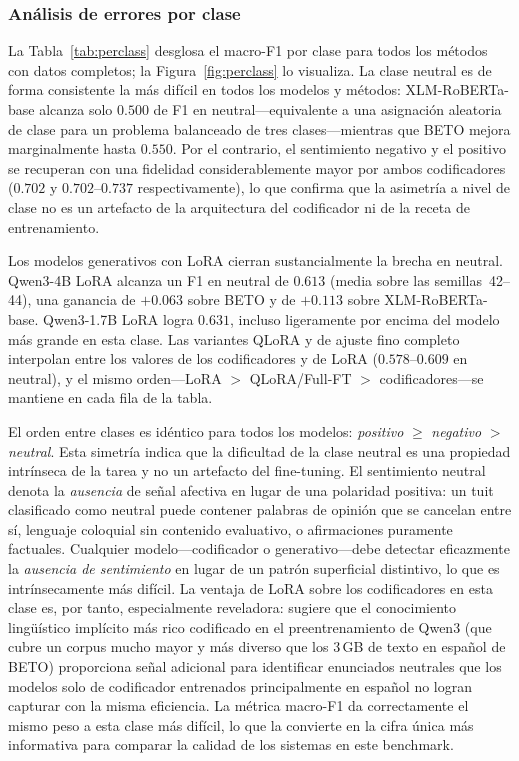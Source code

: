 \documentclass[conference]{IEEEtran}
\begin{document}
\subsubsection*{Análisis de errores por clase}

La Tabla~\ref{tab:perclass} desglosa el macro-F1 por clase para todos los métodos
con datos completos; la Figura~\ref{fig:perclass} lo visualiza.
La clase neutral es de forma consistente la más difícil en todos los modelos y
métodos: XLM-RoBERTa-base alcanza solo $0.500$ de F1 en neutral---equivalente a
una asignación aleatoria de clase para un problema balanceado de tres
clases---mientras que BETO mejora marginalmente hasta $0.550$.
Por el contrario, el sentimiento negativo y el positivo se recuperan con una
fidelidad considerablemente mayor por ambos codificadores ($0.702$ y
$0.702$--$0.737$ respectivamente), lo que confirma que la asimetría a nivel de
clase no es un artefacto de la arquitectura del codificador ni de la receta de
entrenamiento.

Los modelos generativos con LoRA cierran sustancialmente la brecha en neutral.
Qwen3-4B LoRA alcanza un F1 en neutral de $0.613$ (media sobre las
semillas~42--44), una ganancia de $+0.063$ sobre BETO y de $+0.113$ sobre
XLM-RoBERTa-base.
Qwen3-1.7B LoRA logra $0.631$, incluso ligeramente por encima del modelo más
grande en esta clase.
Las variantes QLoRA y de ajuste fino completo interpolan entre los valores de los
codificadores y de LoRA ($0.578$--$0.609$ en neutral), y el mismo orden---LoRA
$>$ QLoRA/Full-FT $>$ codificadores---se mantiene en cada fila de la tabla.

El orden entre clases es idéntico para todos los modelos: \textit{positivo}
$\geq$ \textit{negativo} $>$ \textit{neutral}.
Esta simetría indica que la dificultad de la clase neutral es una propiedad
intrínseca de la tarea y no un artefacto del fine-tuning.
El sentimiento neutral denota la \emph{ausencia} de señal afectiva en lugar de
una polaridad positiva: un tuit clasificado como neutral puede contener palabras
de opinión que se cancelan entre sí, lenguaje coloquial sin contenido
evaluativo, o afirmaciones puramente factuales.
Cualquier modelo---codificador o generativo---debe detectar eficazmente la
\emph{ausencia de sentimiento} en lugar de un patrón superficial distintivo, lo
que es intrínsecamente más difícil.
La ventaja de LoRA sobre los codificadores en esta clase es, por tanto,
especialmente reveladora: sugiere que el conocimiento lingüístico implícito más
rico codificado en el preentrenamiento de Qwen3 (que cubre un corpus mucho mayor
y más diverso que los 3\,GB de texto en español de BETO) proporciona señal
adicional para identificar enunciados neutrales que los modelos solo de
codificador entrenados principalmente en español no logran capturar con la misma
eficiencia.
La métrica macro-F1 da correctamente el mismo peso a esta clase más difícil, lo
que la convierte en la cifra única más informativa para comparar la calidad de
los sistemas en este benchmark.
\end{document}
